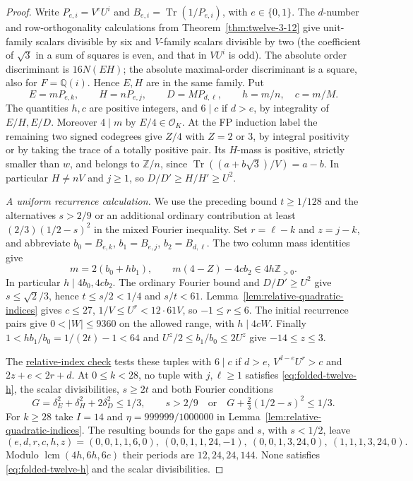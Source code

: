 \documentclass[11pt,reqno]{amsart}
\newcommand{\codecheck}[2]{\href{https://github.com/sebastienpalcoux/grothendieck-ring-classification/blob/d5750105bb5758f3ad38d2e5464dfcc12c019816/supplements/rank6/sphericality/#1}{#2}}
\theoremstyle{remark}\newtheorem{remark}[theorem]{Remark}
\numberwithin{equation}{section}
\begin{document}
\begin{proof}
Write $P_{e,i}=V^eU^i$ and $B_{e,i}=\operatorname{Tr}(1/P_{e,i})$, with $e\in\{0,1\}$. The $d$-number and row-orthogonality calculations from Theorem~\ref{thm:twelve-3-12} give unit-family scalars divisible by six and $V$-family scalars divisible by two (the coefficient of $\sqrt3$ in a sum of squares is even, and that in $VU^i$ is odd). The absolute order discriminant is $16 N(EH)$; the absolute maximal-order discriminant is a square, also for $F=\mathbb Q(i)$. Hence $E,H$ are in the same family. Put
\[
 E=mP_{e,k},\qquad H=nP_{e,j},\qquad D=MP_{d,\ell},\qquad h=m/n,\quad c=m/M .
\]
The quantities $h,c$ are positive integers, and $6\mid c$ if $d>e$, by integrality of $E/H,E/D$. Moreover $4\mid m$ by $E/4\in\mathcal O_K$. At the FP induction label the remaining two signed codegrees give $Z/4$ with $Z=2$ or $3$, by integral positivity or by taking the trace of a totally positive pair. Its $H$-mass is positive, strictly smaller than $w$, and belongs to $\mathbb Z/n$, since $\operatorname{Tr}((a+b\sqrt3)/V)=a-b$. In particular $H\ne nV$ and $j\ge1$, so $D/D'\ge H/H'\ge U^2$. 

\smallskip\emph{A uniform recurrence calculation.}
We use the preceding bound $t\ge1/128$ and the alternatives $s>2/9$ or an additional ordinary contribution at least $(2/3)(1/2-s)^2$ in the mixed Fourier inequality. Set $r=\ell-k$ and $z=j-k$, and abbreviate $b_0=B_{e,k}$, $b_1=B_{e,j}$, $b_2=B_{d,\ell}$. The two column mass identities give
\begin{equation}\label{eq:folded-twelve-h}
 m=2(b_0+h b_1),\qquad m(4-Z)-4cb_2\in4h\mathbb Z_{>0}.
\end{equation}
In particular $h\mid4b_0,4cb_2$. The ordinary Fourier bound and
$D/D'\ge U^2$ give $s\le\sqrt2/3$, hence $t\le s/2<1/4$ and
$s/t<61$. Lemma~\ref{lem:relative-quadratic-indices} gives $c\le27$,
$1/V\le U^r<12\cdot61V$, so $-1\le r\le6$. The initial
recurrence pairs give $0<|W|\le9360$ on the allowed range, with
$h\mid4cW$. Finally $1<hb_1/b_0=1/(2t)-1<64$ and
$U^z/2\le b_1/b_0\le2U^z$ give $-14\le z\le3$.

The \codecheck{folded_twelve_check.py}{relative-index check}
tests these tuples with $6\mid c$ if $d>e$, $V^{d-e}U^r>c$ and
$2z+e<2r+d$. At $0\le k<28$, no tuple with $j,\ell\ge1$ satisfies
\eqref{eq:folded-twelve-h}, the scalar divisibilities, $s\ge2t$
and both Fourier conditions
\[
 G=\delta_E^2+\delta_H^2+2\delta_D^2\le1/3,\qquad
 s>2/9\quad\text{or}\quad G+\tfrac23(1/2-s)^2\le1/3.
\]
For $k\ge28$ take $I=14$ and $\eta=999999/1000000$ in
Lemma~\ref{lem:relative-quadratic-indices}. The resulting bounds
for the gaps and $s$, with $s<1/2$, leave
\[
 (e,d,r,c,h,z)=(0,0,1,1,6,0),\ (0,0,1,1,24,-1),\
 (0,0,1,3,24,0),\ (1,1,1,3,24,0).
\]
Modulo $\operatorname{lcm}(4h,6h,6c)$ their periods are
$12,24,24,144$. None satisfies \eqref{eq:folded-twelve-h} and the
scalar divisibilities.
\end{proof}
\end{document}

